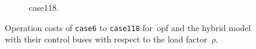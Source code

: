\begin{figure}[t!]
\begin{subfigure}[t]{.45\textwidth}
    \caption{case118.}
    \label{ch:appendix:sec:facts:fig:plot-capacity-cost-controller-case118}
\end{subfigure}
\vspace{0cm}
    \caption{Operation costs of \texttt{case6} to \texttt{case118}
    for~\acrshort{opf} and the hybrid model with their control buses with
    respect to the load factor~$\rho$.}
\label{ch:appendix:sec:facts:plot-capacity-cost-controller}
\end{figure}
% 
\endgroup
% 